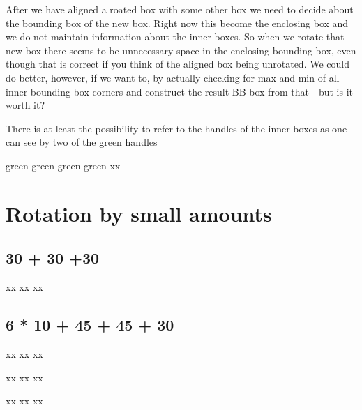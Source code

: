 \documentclass{article}
\newcommand\cbox[2][.8]{{\setlength\fboxsep{0pt}\colorbox[gray]{#1}{#2}}}
\begin{document}
After we have aligned a roated box with some other box we need to decide about
the bounding box of the new box. Right now this become the enclosing box and
we do not maintain information about the inner boxes. So when we rotate that
new box there seems to be unnecessary space in the enclosing bounding box,
even though that is correct if you think of the aligned box being unrotated.
We could do better, however, if we want to, by actually checking for max and
min of all inner bounding box corners and construct the result BB box from
that---but is it worth it?

There is at least the possibility to refer to the handles of the inner boxes
as one can see by two of the green handles

\medskip

\rotatecoffin {}
\displaycoffinhandle {} {green}
\displaycoffinhandle {} {green}
\displaycoffinhandle {} {green}
\displaycoffinhandle {} {green}
x\cbox{\usebox \aaa }x

\newpage

\section{Rotation by small amounts}

\sbox {}

\subsection{30 + 30 +30 }
\rotatecoffin {}
x\cbox{\usebox \aaa }x
\rotatecoffin {}
x\cbox{\usebox \aaa }x
\rotatecoffin {}
x\cbox{\usebox \aaa }x

\subsection{6 * 10 + 45 + 45 + 30}

\rotatecoffin {}
x\cbox{\usebox \aaa }x
\rotatecoffin {}
x\cbox{\usebox \aaa }x
\rotatecoffin {}
x\cbox{\usebox \aaa }x

\vspace{1cm}
\rotatecoffin {}
x\cbox{\usebox \aaa }x
\rotatecoffin {}
x\cbox{\usebox \aaa }x
\rotatecoffin {}
x\cbox{\usebox \aaa }x

\vspace{1cm}
\rotatecoffin {}
x\cbox{\usebox \aaa }x
\rotatecoffin {}
x\cbox{\usebox \aaa }x
\rotatecoffin {}
x\cbox{\usebox \aaa }x
\end{document}
